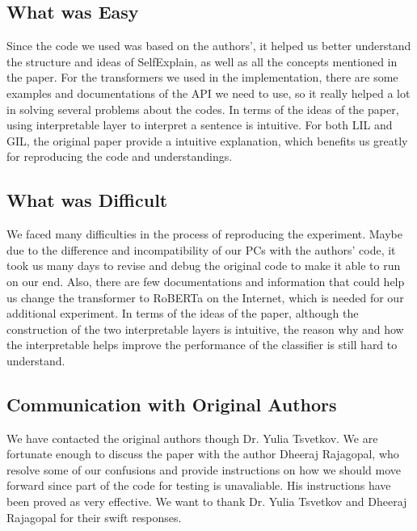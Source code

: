 \documentclass{article}
\begin{document}
\subsection*{What was Easy}

Since the code we used was based on the authors', it helped us better understand the structure and ideas 
of SelfExplain, as well as all the concepts mentioned in the paper. For the transformers we used in the 
implementation, there are some examples and documentations of the API we need to use, so it really 
helped a lot in solving several problems about the codes. In terms of the ideas of the paper, using 
interpretable layer to interpret a sentence is intuitive. For both LIL and GIL, the original paper provide 
a intuitive explanation, which benefits us greatly for reproducing the code and understandings.

\subsection*{What was Difficult}

We faced many difficulties in the process of reproducing the experiment. Maybe due to the difference and incompatibility of our PCs with the authors' code, it took us many days to revise and debug the original code to make it able to run on our end. Also, there are few documentations and information that could help us change the transformer to RoBERTa on the Internet, which is needed for our additional experiment. In terms of the ideas of the paper, although the construction of the two interpretable layers is intuitive, the reason why and how the interpretable helps improve the performance of the classifier is still hard to understand.

\subsection*{Communication with Original Authors}

We have contacted the original authors though Dr. Yulia Tsvetkov. We are fortunate enough to 
discuss the paper with the author Dheeraj Rajagopal, who resolve some of our confusions and 
provide instructions on how we should move forward since part of the code for testing is 
unavaliable. His instructions have been proved as very effective. We want to thank Dr. Yulia Tsvetkov and Dheeraj Rajagopal for their 
swift responses.

\newpage

\end{document}

